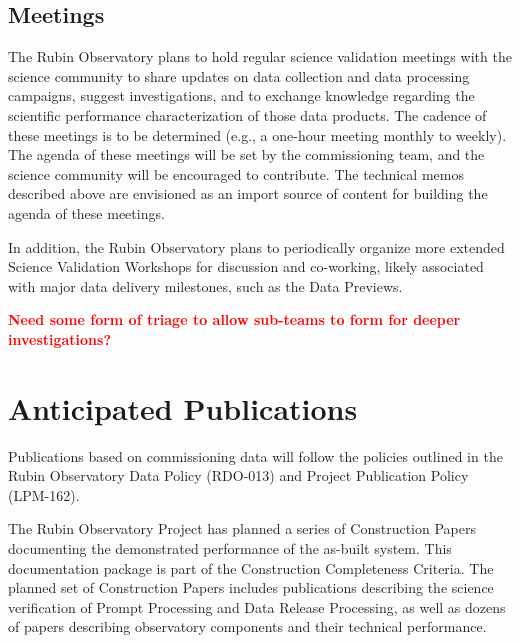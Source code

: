 \documentclass[SE,authoryear,toc]{lsstdoc}
\newcommand{\FIXME}[1]{{\bf \textcolor{red}{#1}}}
\begin{document}
\subsection{Meetings}

The Rubin Observatory plans to hold regular science validation meetings with the science community to share updates on data collection and data processing campaigns, suggest investigations, and to exchange knowledge regarding the scientific performance characterization of those data products.
The cadence of these meetings is to be determined (e.g., a one-hour meeting monthly to weekly).
The agenda of these meetings will be set by the commissioning team, and the science community will be encouraged to contribute.
The technical memos described above are envisioned as an import source of content for building the agenda of these meetings.

In addition, the Rubin Observatory plans to periodically organize more extended Science Validation Workshops for discussion and co-working, likely associated with major data delivery milestones, such as the Data Previews.

\FIXME{Need some form of triage to allow sub-teams to form for deeper investigations?}

\section{Anticipated Publications}

Publications based on commissioning data will follow the policies outlined in the Rubin Observatory Data Policy (RDO-013) and Project Publication Policy (LPM-162).

The Rubin Observatory Project has planned a series of Construction Papers documenting the demonstrated performance of the as-built system. 
This documentation package is part of the Construction Completeness Criteria. 
The planned set of Construction Papers includes publications describing the science verification of Prompt Processing and Data Release Processing, as well as dozens of papers describing observatory components and their technical performance.
\end{document}
